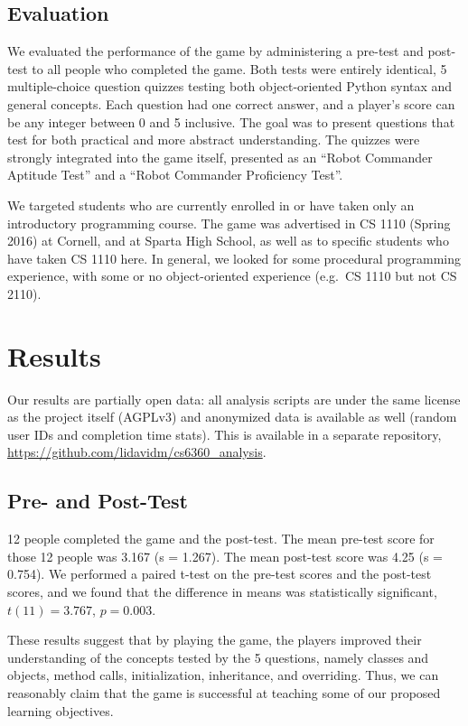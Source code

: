 \documentclass[12pt,notitlepage]{article}
\begin{document}
\subsection{Evaluation}

We evaluated the performance of the game by administering a pre-test
and post-test to all people who completed the game. Both tests were
entirely identical, 5 multiple-choice question quizzes testing both
object-oriented Python syntax and general concepts. Each question had
one correct answer, and a player's score can be any integer between
0 and 5 inclusive. The goal was to present questions that test for both
practical and more abstract understanding. The quizzes were strongly
integrated into the game itself, presented as an
``Robot Commander Aptitude Test'' and a ``Robot Commander Proficiency
Test''.

We targeted students who are currently enrolled in or have taken only
an introductory programming course. The game was advertised in CS 1110
(Spring 2016) at Cornell, and at Sparta High School, as well as
to specific students who have taken CS 1110 here. In general, we
looked for some procedural programming experience, with some or no
object-oriented experience (e.g.\ CS 1110 but not CS 2110).

\section{Results}

Our results are partially open data: all analysis scripts are under
the same license as the project itself (AGPLv3) and anonymized data is
available as well (random user IDs and completion time stats). This is
available in a separate repository,
\url{https://github.com/lidavidm/cs6360_analysis}.

\subsection{Pre- and Post-Test}

12 people completed the game and the post-test. The mean pre-test score
for those 12 people was 3.167 (s = 1.267). The mean post-test score was
4.25 (s = 0.754). We performed a paired t-test on the pre-test scores and
the post-test scores, and we found that the difference in means was
statistically significant, $t(11) = 3.767$, $p = 0.003$.

These results suggest that by playing the game, the players improved their
understanding of the concepts tested by the 5 questions, namely classes and
objects, method calls, initialization, inheritance, and overriding. Thus, we
can reasonably claim that the game is successful at teaching some of our
proposed learning objectives.
\end{document}

